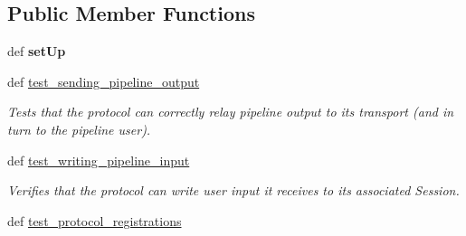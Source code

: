 \subsection*{Public Member Functions}
\begin{DoxyCompactItemize}
\item 
\hypertarget{classhwm_1_1network_1_1protocols_1_1tests_1_1test__data__protocol_1_1_test_pipeline_data_protocol_a02b691476df41b75b71bf33cd750d8a3}{def {\bfseries set\-Up}}\label{classhwm_1_1network_1_1protocols_1_1tests_1_1test__data__protocol_1_1_test_pipeline_data_protocol_a02b691476df41b75b71bf33cd750d8a3}

\item 
\hypertarget{classhwm_1_1network_1_1protocols_1_1tests_1_1test__data__protocol_1_1_test_pipeline_data_protocol_a8e7b28a9b4074d5537091b7a807e3f4b}{def \hyperlink{classhwm_1_1network_1_1protocols_1_1tests_1_1test__data__protocol_1_1_test_pipeline_data_protocol_a8e7b28a9b4074d5537091b7a807e3f4b}{test\-\_\-sending\-\_\-pipeline\-\_\-output}}\label{classhwm_1_1network_1_1protocols_1_1tests_1_1test__data__protocol_1_1_test_pipeline_data_protocol_a8e7b28a9b4074d5537091b7a807e3f4b}

\begin{DoxyCompactList}\small\item\em Tests that the protocol can correctly relay pipeline output to its transport (and in turn to the pipeline user). \end{DoxyCompactList}\item 
\hypertarget{classhwm_1_1network_1_1protocols_1_1tests_1_1test__data__protocol_1_1_test_pipeline_data_protocol_a5f1734a5b7c397dac3ea95f65e190982}{def \hyperlink{classhwm_1_1network_1_1protocols_1_1tests_1_1test__data__protocol_1_1_test_pipeline_data_protocol_a5f1734a5b7c397dac3ea95f65e190982}{test\-\_\-writing\-\_\-pipeline\-\_\-input}}\label{classhwm_1_1network_1_1protocols_1_1tests_1_1test__data__protocol_1_1_test_pipeline_data_protocol_a5f1734a5b7c397dac3ea95f65e190982}

\begin{DoxyCompactList}\small\item\em Verifies that the protocol can write user input it receives to its associated Session. \end{DoxyCompactList}\item 
\hypertarget{classhwm_1_1network_1_1protocols_1_1tests_1_1test__data__protocol_1_1_test_pipeline_data_protocol_ae5326cb60cc0bf6ea62c0be97dfc22a3}{def \hyperlink{classhwm_1_1network_1_1protocols_1_1tests_1_1test__data__protocol_1_1_test_pipeline_data_protocol_ae5326cb60cc0bf6ea62c0be97dfc22a3}{test\-\_\-protocol\-\_\-registrations}}\label{classhwm_1_1network_1_1protocols_1_1tests_1_1test__data__protocol_1_1_test_pipeline_data_protocol_ae5326cb60cc0bf6ea62c0be97dfc22a3}


\end{DoxyCompactItemize}
